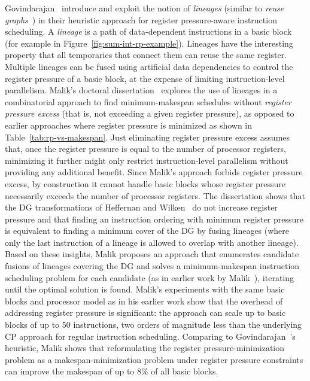 \documentclass[acmsmall,authorversion,nonacm]{acmart}
\begin{document}
Govindarajan~\etal{} introduce and exploit the notion of
\emph{lineages} (similar to \emph{reuse
  graphs}~\cite{Berson1996,Touati2002}) in their heuristic approach
for register pressure-aware instruction scheduling.
A \emph{lineage} is a path of data-dependent instructions in a basic
block (for example
 in
Figure~\ref{fig:sum-int-rp-example}).
Lineages have the interesting property that all temporaries that
connect them can reuse the same register.
Multiple lineages can be fused using artificial data dependencies to
control the register pressure of a basic block, at the expense of
limiting instruction-level parallelism.
Malik's doctoral dissertation~\cite[Chapter 5]{Malik2008c} explores
the use of lineages in a combinatorial approach to find
minimum-makespan schedules without \emph{register pressure excess}
(that is, not exceeding a given register pressure), as opposed to
earlier approaches where register pressure is minimized as shown in
Table~\ref{tab:rp-vs-makespan}.
Just eliminating register pressure excess assumes that, once the
register pressure is equal to the number of processor registers,
minimizing it further might only restrict instruction-level
parallelism without providing any additional benefit.
Since Malik's approach forbids register pressure excess, by
construction it cannot handle basic blocks whose register pressure
necessarily exceeds the number of processor registers.
The dissertation shows that the DG transformations of Heffernan and
Wilken~\cite{Heffernan2006} do not increase register pressure and that
finding an instruction ordering with minimum register pressure is
equivalent to finding a minimum cover of the DG by fusing lineages
(where only the last instruction of a lineage is allowed to overlap
with another lineage).
Based on these insights, Malik proposes an approach that enumerates
candidate fusions of lineages covering the DG and solves a
minimum-makespan instruction scheduling problem for each candidate (as
in earlier work by Malik~\etal{}), iterating until the optimal
solution is found.
Malik's experiments with the same basic blocks and processor model as
in his earlier work show that the overhead of addressing register
pressure is significant: the approach can scale up to basic blocks of
up to 50 instructions, two orders of magnitude less than the
underlying CP approach for regular instruction scheduling.
Comparing to Govindarajan~\etal{}'s heuristic, Malik shows that
reformulating the register pressure-minimization problem as a
makespan-minimization problem under register pressure constraints can
improve the makespan of up to 8\% of all basic blocks.
\end{document}
